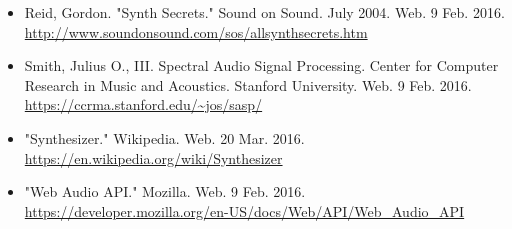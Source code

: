 \documentclass[a4paper, 12pt]{article}
\begin{document}
\begin{itemize}

\item Reid, Gordon. "Synth Secrets." Sound on Sound. July 2004. Web. 9 Feb. 2016. \\
\url{http://www.soundonsound.com/sos/allsynthsecrets.htm} 

\item Smith, Julius O., III. Spectral Audio Signal Processing. Center for Computer Research in Music and Acoustics. Stanford University. Web. 9 Feb. 2016. \\
\url{https://ccrma.stanford.edu/~jos/sasp/}

\item "Synthesizer." Wikipedia. Web. 20 Mar. 2016.\\
\url{https://en.wikipedia.org/wiki/Synthesizer}

\item "Web Audio API." Mozilla. Web. 9 Feb. 2016. \\
\url{https://developer.mozilla.org/en-US/docs/Web/API/Web_Audio_API}


\end{itemize}
\end{document}
